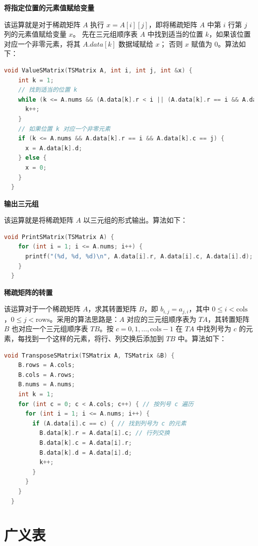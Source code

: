 \documentclass[lang=cn,newtx,10pt,scheme=chinese]{elegantbook}
\begin{document}
\textbf{将指定位置的元素值赋给变量}

该运算就是对于稀疏矩阵 $A$ 执行 $x = A[i][j]$，即将稀疏矩阵 $A$ 中第 $i$ 行第 $j$ 列的元素值赋给变量 $x$。
先在三元组顺序表 $A$ 中找到适当的位置 $k$，如果该位置对应一个非零元素，将其 $A.data[k]$ 数据域赋给 $x$；
否则 $x$ 赋值为 $0$。算法如下：

\begin{lstlisting}[language=C++, caption={稀疏矩阵三元组顺序表的取值操作}]
  void ValueSMatrix(TSMatrix A, int i, int j, int &x) {
    int k = 1;
    // 找到适当的位置 k
    while (k <= A.nums && (A.data[k].r < i || (A.data[k].r == i && A.data[k].c < j))) {
      k++;
    }
    // 如果位置 k 对应一个非零元素
    if (k <= A.nums && A.data[k].r == i && A.data[k].c == j) {
      x = A.data[k].d;
    } else {
      x = 0;
    }
  }
\end{lstlisting}

\textbf{输出三元组}

该运算就是将稀疏矩阵 $A$ 以三元组的形式输出。算法如下：

\begin{lstlisting}[language=C, caption={输出稀疏矩阵的三元组}]
  void PrintSMatrix(TSMatrix A) {
    for (int i = 1; i <= A.nums; i++) {
      printf("(%d, %d, %d)\n", A.data[i].r, A.data[i].c, A.data[i].d);
    }
  }

\end{lstlisting}

\textbf{稀疏矩阵的转置}

该运算对于一个稀疏矩阵 $A$，求其转置矩阵 $B$，即 $b_{i,j} = a_{j,i}$，其中 $0 \leq i < \text{cols}$，$0 \leq j < \text{rows}$。采用的算法思路是：$A$ 对应的三元组顺序表为 $TA$，其转置矩阵 $B$ 也对应一个三元组顺序表 $TB$。按 $c = 0, 1, \dots, \text{cols}-1$ 在 $TA$ 中找列号为 $c$ 的元素，每找到一个这样的元素，将行、列交换后添加到 $TB$ 中。算法如下：

\begin{lstlisting}[language=C++, caption={稀疏矩阵的转置}]
  void TransposeSMatrix(TSMatrix A, TSMatrix &B) {
    B.rows = A.cols;
    B.cols = A.rows;
    B.nums = A.nums;
    int k = 1;
    for (int c = 0; c < A.cols; c++) { // 按列号 c 遍历
      for (int i = 1; i <= A.nums; i++) {
        if (A.data[i].c == c) { // 找到列号为 c 的元素
          B.data[k].r = A.data[i].c; // 行列交换
          B.data[k].c = A.data[i].r;
          B.data[k].d = A.data[i].d;
          k++;
        }
      }
    }
  }
\end{lstlisting}

\section{广义表}
\end{document}

